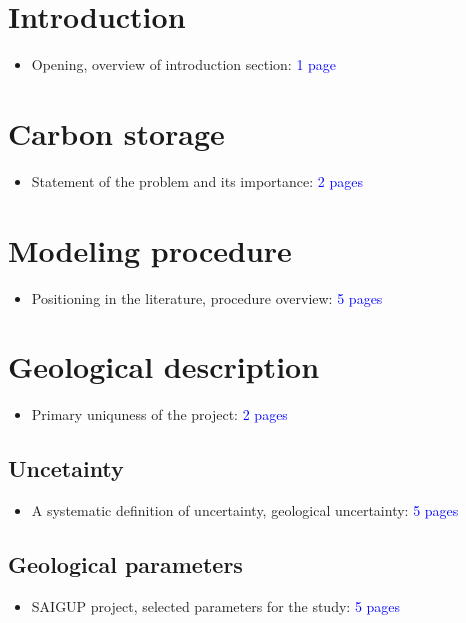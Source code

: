 \documentclass[english]{article}
\begin{document}
\section{Introduction}
\begin{itemize}
\item Opening, overview of introduction section:\textcolor{blue}{{} 1 page}
\end{itemize}

\section{Carbon storage}
\begin{itemize}
\item Statement of the problem and its importance:\textcolor{blue}{{} 2 pages}
\end{itemize}

\section{Modeling procedure}
\begin{itemize}
\item Positioning in the literature, procedure overview: \textcolor{blue}{5
pages}
\end{itemize}

\section{Geological description}
\begin{itemize}
\item Primary uniquness of the project: \textcolor{blue}{2 pages}
\end{itemize}

\subsection{Uncetainty}
\begin{itemize}
\item A systematic definition of uncertainty, geological uncertainty: \textcolor{blue}{5
pages}
\end{itemize}

\subsection{Geological parameters}
\begin{itemize}
\item SAIGUP project, selected parameters for the study: \textcolor{blue}{5
pages}
\end{itemize}
\end{document}
